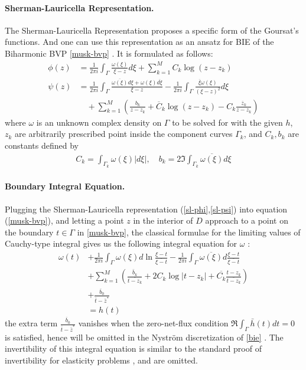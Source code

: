 \documentclass[10pt,twocolumn]{article}
\begin{document}
\paragraph*{Sherman-Lauricella Representation.} 
The Sherman-Lauricella Representation proposes a specific form of the Goursat's functions. And one can use this representation as an ansatz for BIE of the Biharmonic BVP \eqref{musk-bvp}
\cite{greengardIntegralEquationMethods1996}. 
It is formulated as follows:
\begin{align}
  \phi(z) &=
    \frac {1}{2\pi i} \int_\Gamma \frac{\omega(\xi)}{\xi - z} d\xi  
    + \sum_{k=1}^M C_k \log (z-z_k) \label{sl-phi}
    \\
  \psi(z) &=
    \frac {1}{2\pi i} \int_\Gamma \frac{\overline{\omega(\xi)}d\xi +  \omega(\xi)\overline{d\xi}}{\xi - z}  
    - \frac {1}{2\pi i} \int_\Gamma \frac{\overline{\xi} \omega(\xi)}{(\xi - z)^2} d\xi  \label{sl-psi}
    \\
    & \quad + \sum _{k=1}^M 
    \left( \frac{b_k}{z-z_k} + \overline C_k \log (z-z_k) -  C_k \frac{\overline z_k}{z-z_k} \right) \nonumber 
\end{align}
where $\omega$ is an unknown complex density on $\Gamma$ to be solved 
for with the given $h$, 
$z_k$ are arbitrarily prescribed point inside the component curves $\Gamma_k$, 
and $C_k, b_k$ are constants defined by 
\begin{align}
  C_k = \int_{\Gamma_k} \omega(\xi) |d\xi|, \quad b_k = 2 \Im\int_{\Gamma_k} \overline{\omega(\xi)} {d\xi}
\end{align}

\paragraph*{Boundary Integral Equation.} 
Plugging the Sherman-Lauricella representation (\ref{sl-phi},\ref{sl-psi}) into equation (\ref{musk-bvp}), 
and letting a point $z$ in the interior of $D$ approach to a point on the boundary $t\in \Gamma$ in \eqref{musk-bvp}, 
the classical formulae for the limiting values of Cauchy-type integral 
gives us the following integral equation for $\omega$ \cite{muschelisviliSingularIntegralEquations1972,greengardIntegralEquationMethods1996}:
\begin{align}
  \omega(t) 
  &+ \frac 1{2\pi i} \int_{\Gamma} \omega(\xi) d\ln \frac{\xi - t}{\overline{\xi - t}} - \frac 1{2\pi i} \int_\Gamma \overline{\omega(\xi)} d \frac{\xi - t}{\overline{\xi - t}} \label{bie} \\
  &+ \sum_{k=1}^M \left( \frac{\bar b_k}{\overline{t- z_k}} +  2C_k \log |t-z_k| + \overline{C_k} \frac{t-z_k}{\overline{ t - z_k}} \right) \nonumber\\
  &+ \frac{\overline b_0}{\bar t - \bar z^*} \nonumber \\
  &= h(t) \nonumber
\end{align}
the extra term $\frac{\overline b_0}{\bar t - \bar z^*}$ vanishes when the zero-net-flux condition $\Re \int_\Gamma \bar h(t) dt = 0$ is satisfied, hence will be omitted in the Nystr\"om discretization of \eqref{bie} . 
The invertibility of this integral equation is similar 
to the standard proof of invertibility for elasticity problems \cite{muskhelishviliBasicProblemsMathematical1977}, and are omitted.
\end{document}
